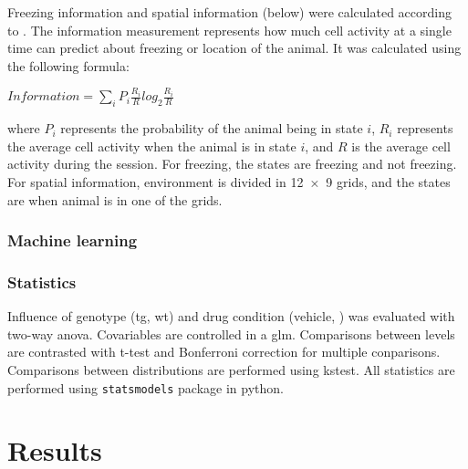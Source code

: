 Freezing information and spatial information (below) were calculated according to \citet{skaggs93}. The information measurement represents how much cell activity at a single time can predict about freezing or location of the animal.  It was calculated using the following formula:

$Information = \displaystyle\sum_{i}^{}P_i  \frac{R_i}{R} log_2 \frac{R_i}{R}$

where $P_i$ represents the probability of the animal being in state $i$,  $R_i$ represents the average cell activity when the animal is in state $i$, and $R$ is the average cell activity during the session. For freezing, the states are freezing and not freezing. For spatial information, environment is divided in \num{12 x 9} grids, and the states are when animal is in one of the grids.

\subsubsection{Machine learning}


\subsubsection{Statistics}

Influence of genotype (\gls{tg}, \gls{wt}) and drug condition (vehicle, \tglu) was evaluated with two-way \gls{anova}. Covariables are controlled in a \gls{glm}. Comparisons between levels are contrasted with t-test and Bonferroni correction for multiple conparisons. Comparisons between distributions are performed using \gls{kstest}. All statistics are performed using \texttt{statsmodels} package in python.


\section{Results}


